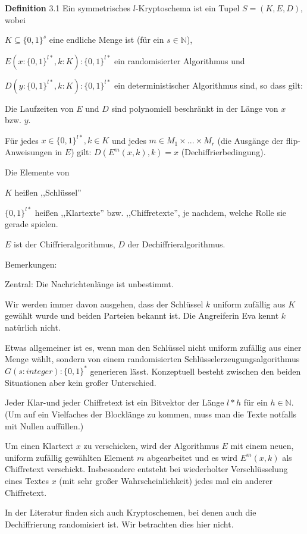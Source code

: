 \documentclass[a4paper]{article}
\begin{document}
\begin{multicols}{3}
    \textbf{Definition} 3.1 Ein symmetrisches $l$-Kryptoschema ist ein Tupel $S= (K,E,D)$, wobei
    \begin{itemize*}
        \item $K\subseteq\{0,1\}^s$ eine endliche Menge ist (für ein $s\in\mathbb{N}$),
        \item $E(x:\{0,1\}^{l*},k:K) :\{0,1\}^{l*}$ ein randomisierter Algorithmus und
        \item $D(y:\{0,1\}^{l*},k:K) :\{0,1\}^{l*}$ ein deterministischer Algorithmus
        sind, so dass gilt:
        \item Die Laufzeiten von $E$ und $D$ sind polynomiell beschränkt in der Länge von $x$ bzw. $y$.
        \item Für jedes $x\in\{0,1\}^{l*},k\in K$ und jedes $m\in M_1\times...\times M_r$ (die Ausgänge der flip-Anweisungen in $E$) gilt: $D(E^m(x,k),k)=x$ (Dechiffrierbedingung).
    \end{itemize*}

    Die Elemente von
    \begin{itemize*}
        \item $K$ heißen ,,Schlüssel''
        \item $\{0,1\}^{l*}$ heißen ,,Klartexte'' bzw. ,,Chiffretexte'', je nachdem, welche Rolle sie gerade spielen.
    \end{itemize*}

    $E$ ist der Chiffrieralgorithmus, $D$ der Dechiffrieralgorithmus.

    Bemerkungen:
    \begin{itemize*}
        \item Zentral: Die Nachrichtenlänge ist unbestimmt.
        \item Wir werden immer davon ausgehen, dass der Schlüssel $k$ uniform zufällig aus $K$ gewählt wurde und beiden Parteien bekannt ist. Die Angreiferin Eva kennt $k$ natürlich nicht.
        \item Etwas allgemeiner ist es, wenn man den Schlüssel nicht uniform zufällig aus einer Menge wählt, sondern von einem randomisierten Schlüsselerzeugungsalgorithmus $G(s:integer):\{0,1\}^*$ generieren lässt. Konzeptuell besteht zwischen den beiden Situationen aber kein großer Unterschied.
        \item Jeder Klar-und jeder Chiffretext ist ein Bitvektor der Länge $l*h$ für ein $h\in\mathbb{N}$. (Um auf ein Vielfaches der Blocklänge zu kommen, muss man die Texte notfalls mit Nullen auffüllen.)
        \item Um einen Klartext $x$ zu verschicken, wird der Algorithmus $E$ mit einem neuen, uniform zufällig gewählten Element $m$ abgearbeitet und es wird $E^m(x,k)$ als Chiffretext verschickt. Insbesondere entsteht bei wiederholter Verschlüsselung eines Textes $x$ (mit sehr großer Wahrscheinlichkeit) jedes mal ein anderer Chiffretext.
        \item In der Literatur finden sich auch Kryptoschemen, bei denen auch die Dechiffrierung randomisiert ist. Wir betrachten dies hier nicht.
    \end{itemize*}


\end{multicols}
\end{document}
